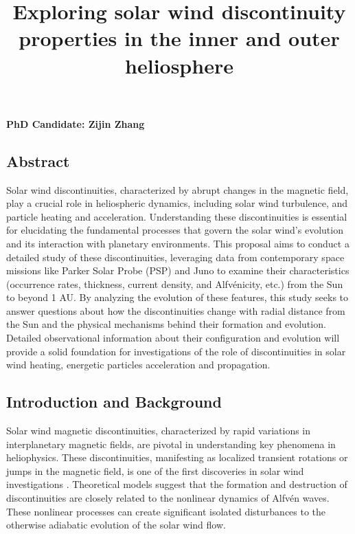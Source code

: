 \documentclass[
  letterpaper,
  DIV=11,
  numbers=noendperiod]{scrartcl}
\title{Exploring solar wind discontinuity properties in the inner and outer heliosphere}
\author{}
\date{}
\begin{document}
\maketitle

\vspace{-20truemm}


\textbf{PhD Candidate: Zijin Zhang}

\subsection{Abstract}\label{abstract}

Solar wind discontinuities, characterized by abrupt changes in the magnetic field, play a crucial role in heliospheric dynamics, including solar wind turbulence, and particle heating and acceleration. Understanding these discontinuities is essential for elucidating the fundamental processes that govern the solar wind's evolution and its interaction with planetary environments. This proposal aims to conduct a detailed study of these discontinuities, leveraging data from contemporary space missions like Parker Solar Probe (PSP) and Juno to examine their characteristics (occurrence rates, thickness, current density, and Alfvénicity, etc.) from the Sun to beyond 1 AU. By analyzing the evolution of these features, this study seeks to answer questions about how the discontinuities change with radial distance from the Sun and the physical mechanisms behind their formation and evolution. Detailed observational information about their configuration and evolution will provide a solid foundation for investigations of the role of discontinuities in solar wind heating, energetic particles
acceleration and propagation.

\subsection{Introduction and Background}\label{introduction-and-background}

Solar wind magnetic discontinuities, characterized by rapid variations in interplanetary magnetic fields, are pivotal in understanding key phenomena in heliophysics. These discontinuities, manifesting as localized transient rotations or jumps in the magnetic field, is one of the first discoveries in solar wind investigations \citep{colburnDiscontinuitiesSolarWind1966}. Theoretical models suggest that the formation and destruction of discontinuities are closely related to the nonlinear dynamics of Alfvén waves. These nonlinear processes can create significant isolated disturbances to the otherwise adiabatic evolution of the solar wind flow.
\end{document}
